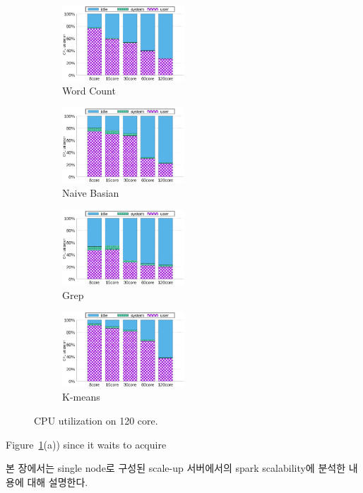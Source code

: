 \begin{figure}[tb]
    \centering
    \begin{subfigure}[b]{0.25\textwidth}
        \includegraphics[width=1.8in]{graph/wc_cpuutils.eps}
        \caption{Word Count}
    \end{subfigure}%
    \begin{subfigure}[b]{0.25\textwidth}
        \includegraphics[width=1.8in]{graph/nb_cpuutils.eps}
        \caption{Naive Basian}
    \end{subfigure}%
    \begin{subfigure}[b]{0.25\textwidth}
        \includegraphics[width=1.8in]{graph/grep_cpuutils.eps}
        \caption{Grep}
    \end{subfigure}%
    \begin{subfigure}[b]{0.25\textwidth}
        \includegraphics[width=1.8in]{graph/kmeans_cpuutils.eps}
        \caption{K-means}
    \end{subfigure}%
        \centering
    \caption{CPU utilization on 120 core.}
    \label{fig:utilization}
\end{figure}
Figure~\ref{fig:utilization}(a)) since it waits to acquire



\ifkor
본 장에서는 single node로 구성된 scale-up 서버에서의 spark scalability에
분석한 내용에 대해 설명한다. 
\else

